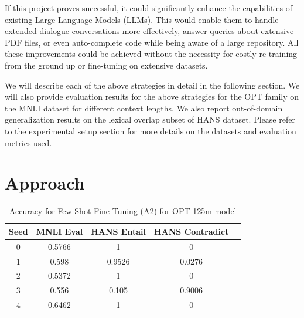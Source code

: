 \documentclass[10pt,twocolumn,letterpaper]{article}
\begin{document}
If this project proves successful, it could significantly enhance the capabilities of existing Large Language Models (LLMs). This would enable them to handle extended dialogue conversations more effectively, answer queries about extensive PDF files, or even auto-complete code while being aware of a large repository. All these improvements could be achieved without the necessity for costly re-training from the ground up or fine-tuning on extensive datasets.


We will describe each of the above strategies in detail in the following section. We will also provide evaluation results for the above strategies for the OPT family on the MNLI dataset for different context lengths. We also report out-of-domain generalization results on the lexical overlap subset of HANS dataset. Please refer to the experimental setup section for more details on the datasets and evaluation metrics used.

\section{Approach}
		
		

\begin{table}[h!]
\begin{center}
\begin{tabular}{|c|c|c|c|c|}
\hline
\textbf{Seed} & \textbf{MNLI Eval} & \textbf{HANS Entail} & \textbf{HANS Contradict} \\
\hline
\hline
0 & 0.5766 & 1 & 0 \\
1 & 0.598 & 0.9526 & 0.0276 \\
2 & 0.5372 & 1 & 0 \\
3 & 0.556 & 0.105 & 0.9006 \\
4 & 0.6462 & 1 & 0 \\
\hline
\end{tabular}
\end{center}
\caption{Accuracy for Few-Shot Fine Tuning (A2) for OPT-125m model}
\end{table}
\end{document}
